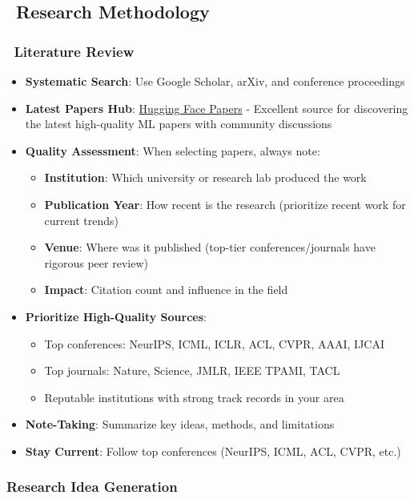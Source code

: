 \documentclass[11pt,a4paper]{article}
\begin{document}
\subsection{\faLightbulb~Research Methodology}

\subsubsection{\faBookReader~Literature Review}
\begin{itemize}
    \item \textbf{Systematic Search}: Use Google Scholar, arXiv, and conference proceedings
    \item \textbf{Latest Papers Hub}: \href{https://huggingface.co/papers}{Hugging Face Papers} - Excellent source for discovering the latest high-quality ML papers with community discussions
    \item \textbf{Quality Assessment}: When selecting papers, always note:
    \begin{itemize}
        \item \textbf{Institution}: Which university or research lab produced the work
        \item \textbf{Publication Year}: How recent is the research (prioritize recent work for current trends)
        \item \textbf{Venue}: Where was it published (top-tier conferences/journals have rigorous peer review)
        \item \textbf{Impact}: Citation count and influence in the field
    \end{itemize}
    \item \textbf{Prioritize High-Quality Sources}:
    \begin{itemize}
        \item Top conferences: NeurIPS, ICML, ICLR, ACL, CVPR, AAAI, IJCAI
        \item Top journals: Nature, Science, JMLR, IEEE TPAMI, TACL
        \item Reputable institutions with strong track records in your area
    \end{itemize}
    \item \textbf{Note-Taking}: Summarize key ideas, methods, and limitations
    \item \textbf{Stay Current}: Follow top conferences (NeurIPS, ICML, ACL, CVPR, etc.)
\end{itemize}

\subsubsection{Research Idea Generation}
\end{document}
